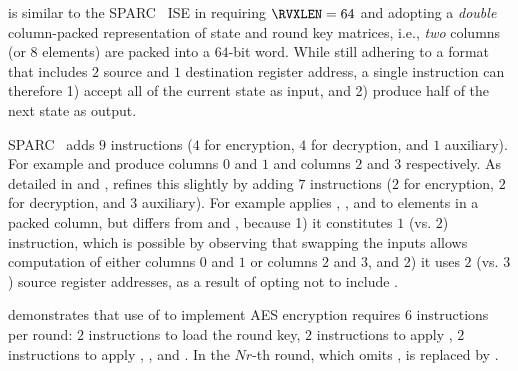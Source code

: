 
is similar to the SPARC~\cite[Page 109]{SPARC:16} ISE in
requiring
$\RVXLEN = 64$
and adopting a 
{\em double}
column-packed 
representation of state and round key matrices,
i.e., {\em two} columns (or $8$ elements) are packed into a $64$-bit word.
While still adhering to a format that
includes $2$ source and $1$ destination register address,
a single instruction can therefore 
1) accept  all  of the current state as  input,
   and
2) produce half of the next    state as output.

SPARC~\cite[Page 109]{SPARC:16}
adds
$ 9$
instructions ($4$ for encryption, $4$ for decryption, and $1$ auxiliary).
For example
and
produce
columns $0$ and $1$
and
columns $2$ and $3$
respectively.
As detailed in
and
,
refines this slightly by 
adding 
$ 7$
instructions ($2$ for encryption, $2$ for decryption, and $3$ auxiliary).
For example
applies
, , and   
to elements in   a packed column,
but differs from 
and
,
because
1) it constitutes
   $1$ (vs. $2$)
   instruction,
   which is possible by observing that swapping the inputs allows 
   computation of either 
   columns $0$ and $1$ 
   or 
   columns $2$ and $3$,
   and
2) it uses 
   $2$ (vs. $3$)
   source register addresses, 
   as a result of opting not to include
   .

demonstrates that use of  to implement AES encryption requires
$ 6$ instructions per round:
$ 2$            
     instructions to load the round key,
$ 2$            
     instructions to apply ,
$ 2$   
     instructions to apply , , and .
In the $Nr$-th round, which omits ,
is replaced by 
     .

